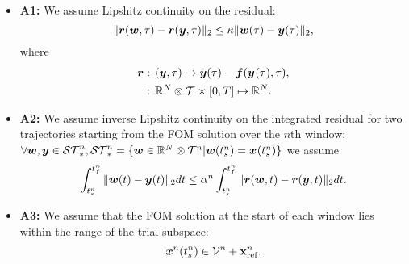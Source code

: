 \begin{itemize}
\item \textbf{A1:} We assume  Lipshitz continuity on the residual:
$$ \| \boldsymbol r(\boldsymbol w,\tau) - \boldsymbol r(\boldsymbol y,\tau)  \|_2 \le \kappa \| \boldsymbol w(\tau) - \boldsymbol y(\tau) \|_2,$$
where  
\begin{align*}
\boldsymbol r &: \, (\boldsymbol y,\tau) \mapsto \dot{\boldsymbol y}(\tau) - \boldsymbol f(\boldsymbol y^{}(\tau),\tau) ,\\
&: \, \mathbb{R}^{N} \otimes \mathcal{T}^{} \times [0,T] \mapsto \mathbb{R}^{N}.
\end{align*}

\item \textbf{A2:} We assume inverse Lipshitz continuity on the integrated residual for two trajectories starting from the FOM solution over the $n$th window:
$\forall \boldsymbol w,\boldsymbol y \in \mathcal{ ST }^{n}_*, \mathcal{ ST }^{n}_* = \{ \boldsymbol w \in \mathbb{R}^{N} \otimes \mathcal{T}^{n} | \boldsymbol w(t_s^{n}) = {\boldsymbol x}^{}(t_s^{n}) \}$ we assume 
$$  \int_{t_s^{n}}^{t_f^{n}} \| \boldsymbol w(t) - \boldsymbol y(t) \|_2 dt \le  \alpha^{n} \int_{t_s^{n}}^{t_f^{n}} \| \boldsymbol r(\boldsymbol w,t) - \boldsymbol r(\boldsymbol y,t)  \|_2 dt.$$
\item \textbf{A3:} We assume that the FOM solution at the start of each window lies within the range of the trial subspace:
$$ {\boldsymbol x}^{n}(t_s^{n}) \in \mathcal{V }^{n} + \mathbf{x}_\text{ref}^{n}.$$
\end{itemize} 
%


